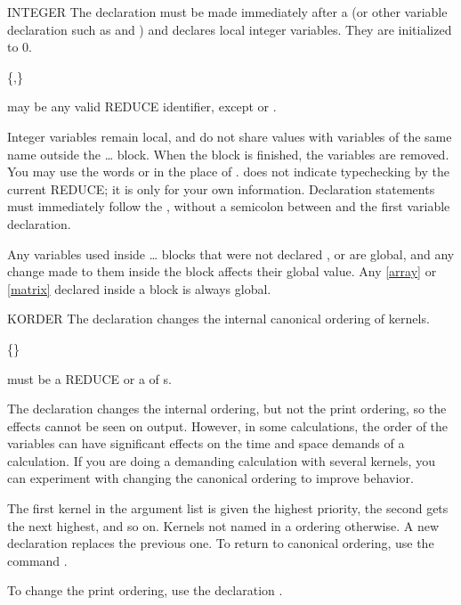 \begin{Declaration}{INTEGER}
The  declaration must be made immediately after a
 (or other variable declaration such as 
and ) and declares local integer variables.  They are
initialized to 0.
\begin{Syntax}
 \{,\}\optional
\end{Syntax}

 may be any valid REDUCE identifier, except
 or .

\begin{Comments}
Integer variables remain local, and do not share values with variables of
the same name outside the \ldots{} block.  When the
block is finished, the variables are removed.  You may use the words
 or  in the place of .
 does not indicate typechecking by the
current REDUCE; it is only for your own information.  Declaration
statements must immediately follow the , without a semicolon
between  and the first variable declaration.

Any variables used inside \ldots{} blocks that were not
declared ,  or  are global, and any
change made to them inside the block affects their global value.  Any
\ref{array} or \ref{matrix} declared inside a block is always global.
\end{Comments}
\end{Declaration}


\begin{Declaration}{KORDER}
The  declaration changes the internal canonical ordering of
kernels.
\begin{Syntax}
 \{\name{,}\}\optional
\end{Syntax}

 must be a REDUCE  or a  of
s.

\begin{Comments}
The declaration  changes the internal ordering, but not the print
ordering, so the effects cannot be seen on output.  However, in some 
calculations, the order of the variables can have significant effects on the 
time and space demands of a calculation.  If you are doing a demanding 
calculation with several kernels, you can experiment with changing the 
canonical ordering to improve behavior.

The first kernel in the argument list is given the highest priority, the
second gets the next highest, and so on.  Kernels not named in a
 ordering otherwise.  A new  declaration replaces 
the previous one.  To return to canonical ordering, use the command 
.

To change the print ordering, use the declaration .
\end{Comments}
\end{Declaration}


